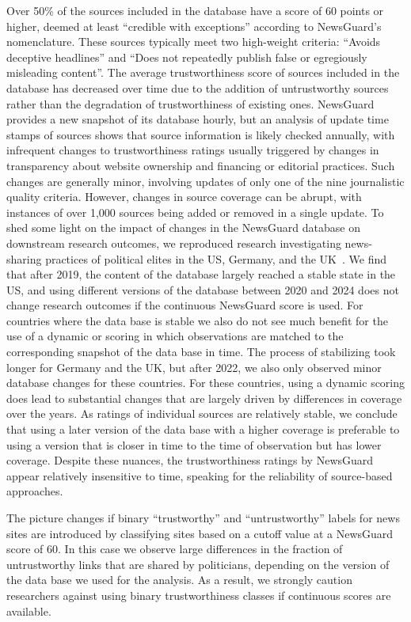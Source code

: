 \documentclass[12pt,twoside]{article}
\begin{document}
Over 50\% of the sources included in the database have a score of 60 points or higher, deemed at least ``credible with exceptions'' according to NewsGuard's nomenclature. 
These sources typically meet two high-weight criteria: ``Avoids deceptive headlines'' and ``Does not repeatedly publish false or egregiously misleading content''. 
The average trustworthiness score of sources included in the database has decreased over time due to the addition of untrustworthy sources rather than the degradation of trustworthiness of existing ones.
NewsGuard provides a new snapshot of its database hourly, but an analysis of update time stamps of sources shows that source information is likely checked annually, with infrequent changes to trustworthiness ratings usually triggered by changes in transparency about website ownership and financing or editorial practices.
Such changes are generally minor, involving updates of only one of the nine journalistic quality criteria. 
However, changes in source coverage can be abrupt, with instances of over 1,000 sources being added or removed in a single update.
To shed some light on the impact of changes in the NewsGuard database on downstream research outcomes, we reproduced research investigating news-sharing practices of political elites in the US, Germany, and the UK~\citep{lasserSocialMediaSharing2022c}. 
We find that after 2019, the content of the database largely reached a stable state in the US, and using different versions of the database between 2020 and 2024 does not change research outcomes if the continuous NewsGuard score is used. 
For countries where the data base is stable we also do not see much benefit for the use of a dynamic or scoring in which observations are matched to the corresponding snapshot of the data base in time.
The process of stabilizing took longer for Germany and the UK, but after 2022, we also only observed minor database changes for these countries. 
For these countries, using a dynamic scoring does lead to substantial changes that are largely driven by differences in coverage over the years.
As ratings of individual sources are relatively stable, we conclude that using a later version of the data base with a higher coverage is preferable to using a version that is closer in time to the time of observation but has lower coverage.
Despite these nuances, the trustworthiness ratings by NewsGuard appear relatively insensitive to time, speaking for the reliability of source-based approaches. 

The picture changes if binary ``trustworthy'' and ``untrustworthy'' labels for news sites are introduced by classifying sites based on a cutoff value at a NewsGuard score of 60.
In this case we observe large differences in the fraction of untrustworthy links that are shared by politicians, depending on the version of the data base we used for the analysis.
As a result, we strongly caution researchers against using binary trustworthiness classes if continuous scores are available.
\end{document}
